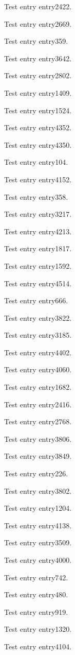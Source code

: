Test entry \gls{entry2422}.

Test entry \gls{entry2669}.

Test entry \gls{entry359}.

Test entry \gls{entry3642}.

Test entry \gls{entry2802}.

Test entry \gls{entry1409}.

Test entry \gls{entry1524}.

Test entry \gls{entry4352}.

Test entry \gls{entry4350}.

Test entry \gls{entry104}.

Test entry \gls{entry4152}.

Test entry \gls{entry358}.

Test entry \gls{entry3217}.

Test entry \gls{entry4213}.

Test entry \gls{entry1817}.

Test entry \gls{entry1592}.

Test entry \gls{entry4514}.

Test entry \gls{entry666}.

Test entry \gls{entry3822}.

Test entry \gls{entry3185}.

Test entry \gls{entry4402}.

Test entry \gls{entry4060}.

Test entry \gls{entry1682}.

Test entry \gls{entry2416}.

Test entry \gls{entry2768}.

Test entry \gls{entry3806}.

Test entry \gls{entry3849}.

Test entry \gls{entry226}.

Test entry \gls{entry3802}.

Test entry \gls{entry1204}.

Test entry \gls{entry4138}.

Test entry \gls{entry3509}.

Test entry \gls{entry4000}.

Test entry \gls{entry742}.

Test entry \gls{entry480}.

Test entry \gls{entry919}.

Test entry \gls{entry1320}.

Test entry \gls{entry4104}.

